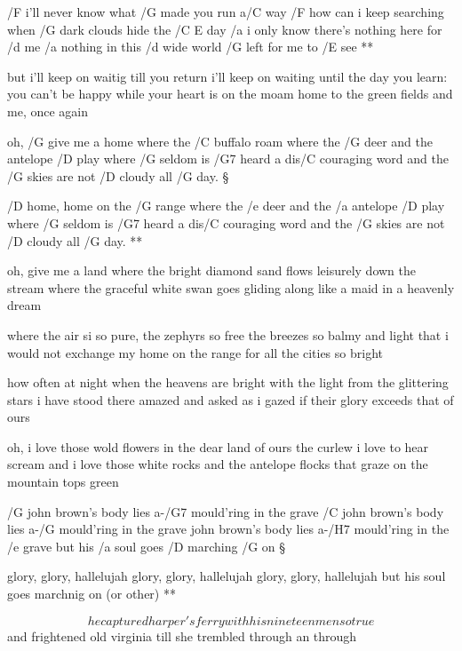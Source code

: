 \R  /F i'll never know what /G made you run a/C way
    /F how can i keep searching when /G dark clouds hide the /{C E} day
    /a i only know there's nothing here for /d me
    /a nothing in this /d wide world /G left for me to /E see **

but i'll keep on waitig till you return
i'll keep on waiting until the day you learn:
you can't be happy while your heart is on the moam
home to the green fields and me, once again




oh, /G give me a home where the /C buffalo roam
where the /G deer and the antelope /D play
where /G seldom is /G7 heard a dis/C couraging word
and the /G skies are not /D cloudy all /G day. \S

\R  /D home, home on the /G range
    where the /e deer and the /a antelope /D play
    where /G seldom is /G7 heard a dis/C couraging word
    and the /G skies are not /D cloudy all /G day. **

oh, give me a land where the bright diamond sand
flows leisurely down the stream
where the graceful white swan goes gliding along
like a maid in a heavenly dream \s

where the air si so pure, the zephyrs so free
the breezes so balmy and light
that i would not exchange my home on the range
for all the cities so bright \s

how often at night when the heavens are bright
with the light from the glittering stars
i have stood there amazed and asked as i gazed
if their glory exceeds that of ours \s

oh, i love those wold flowers in the dear land of ours
the curlew i love to hear scream
and i love those white rocks and the antelope flocks
that graze on the mountain tops green \s




/G john brown's body lies a-/G7 mould'ring in the grave
/C john brown's body lies a-/G mould'ring in the grave
john brown's body lies a-/H7 mould'ring in the /e grave
but his /a soul goes /D marching /G on \S


\R  glory, glory, hallelujah
    glory, glory, hallelujah
    glory, glory, hallelujah
    but his soul goes marchnig on  \qquad (or other) **

\[ he captured harper's ferry with his nineteen men so true \]
and frightened old virginia till she trembled through an through \s

